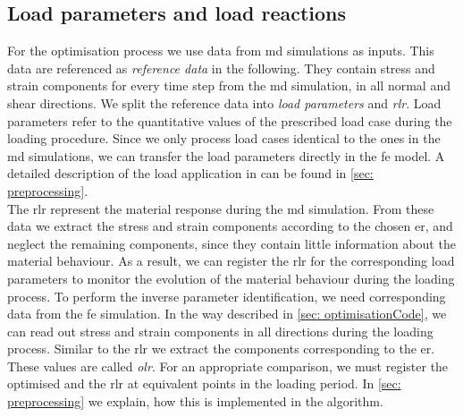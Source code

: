 \subsection{Load parameters and load reactions}\label{subsec:loadParameters}
For the optimisation process we use data from \acrshort{md} simulations as inputs.
This data are referenced as \emph{reference data} in the following. They contain stress and strain components for every time step from the \acrshort{md} simulation, in all normal and shear directions.
We split the reference data into \emph{load parameters} and \emph{\acrlong{rlr}}.
Load parameters refer to the quantitative values of the prescribed load case during the loading procedure.
Since we only process load cases identical to the ones in the \acrshort{md} simulations, we can transfer the load parameters directly in the \acrshort{fe} model.
A detailed description of the load application in  can be found in \autoref{sec: preprocessing}. \\
\indent The \acrlong{rlr} represent the material response during the \acrshort{md} simulation.
From these data we extract the stress and strain components according to the chosen \acrlong{er}, and neglect the remaining components, since they contain little information about the material behaviour.
As a result, we can register the \acrlong{rlr} for the corresponding load parameters to monitor the evolution of the material behaviour during the loading process.
To perform the inverse parameter identification, we need corresponding data from the \acrshort{fe} simulation.
In the way described in \autoref{sec: optimisationCode}, we can read out stress and strain components in all directions during the loading process.
Similar to the \acrlong{rlr} we extract the components corresponding to the \acrlong{er}.
These values are called \emph{\acrlong{olr}}. 
For an appropriate comparison, we must register the optimised and the \acrlong{rlr} at equivalent points in the loading period.
In \autoref{sec: preprocessing} we explain, how this is implemented in the algorithm.

